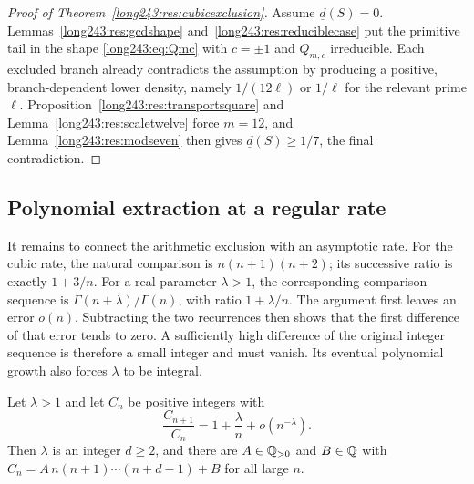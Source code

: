 \documentclass[11pt]{article}
\begin{document}
\begin{proof}[Proof of Theorem~\ref{long243:res:cubicexclusion}]
Assume $\underline d(S)=0$.  Lemmas~\ref{long243:res:gcdshape}
and~\ref{long243:res:reduciblecase} put the primitive tail in the shape \eqref{long243:eq:Qmc}
with $c=\pm1$ and $Q_{m,c}$ irreducible.  Each excluded branch already
contradicts the assumption by producing a positive, branch-dependent lower
density, namely $1/(12\ell)$ or $1/\ell$ for the relevant prime $\ell$.
Proposition~\ref{long243:res:transportsquare} and Lemma~\ref{long243:res:scaletwelve} force
$m=12$, and Lemma~\ref{long243:res:modseven} then gives
$\underline d(S)\ge1/7$, the final contradiction.
\end{proof}

\subsection{Polynomial extraction at a regular rate}

It remains to connect the arithmetic exclusion with an asymptotic
rate. For the cubic rate, the natural comparison is $n(n+1)(n+2)$;
its successive ratio is exactly $1+3/n$. For a real parameter
$\lambda>1$, the corresponding comparison sequence is
$\Gamma(n+\lambda)/\Gamma(n)$, with ratio $1+\lambda/n$.
The argument first leaves an error $o(n)$. Subtracting the two
recurrences then shows that the first difference of that error tends
to zero. A sufficiently high difference of the original integer
sequence is therefore a small integer and must vanish. Its eventual
polynomial growth also forces $\lambda$ to be integral.

\begin{lemma}\label{long243:res:extraction}
Let $\lambda>1$ and let $C_n$ be positive integers with
\begin{equation}\label{long243:eq:regularrate}
 \frac{C_{n+1}}{C_n}=1+\frac\lambda n+o(n^{-\lambda}).
\end{equation}
Then $\lambda$ is an integer $d\ge2$, and there are $A\in\mathbb{Q}_{>0}$ and
$B\in\mathbb{Q}$ with $C_n=A\,n(n+1)\cdots(n+d-1)+B$ for all large $n$.
\end{lemma}
\end{document}
